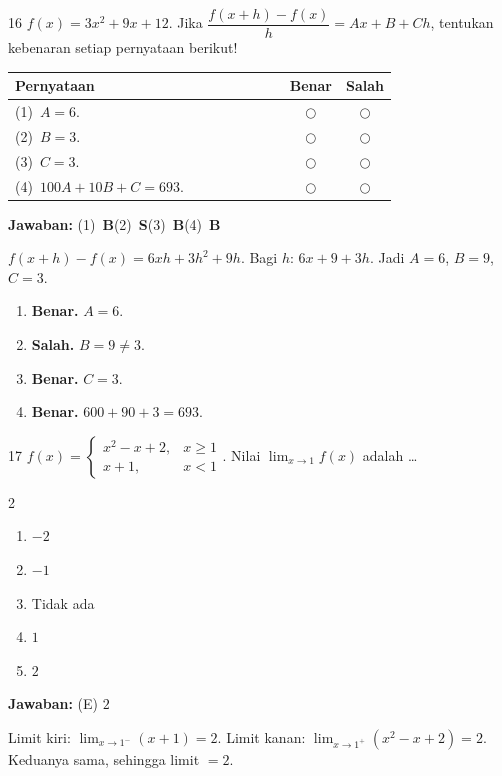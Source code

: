 \documentclass[11pt]{article}
\newcommand{\jawaban}[1]{%
  \noindent\colorbox{gold!30}{\parbox{\dimexpr\linewidth-2\fboxsep\relax}{%
    \textbf{Jawaban:} #1}}\par\smallskip}
\newenvironment{pilB}{%
  \par\smallskip\begin{multicols}{2}
  \begin{enumerate}[label=(\Alph*),leftmargin=*,itemsep=1pt,topsep=3pt]}%
  {\end{enumerate}\end{multicols}}
\begin{document}
\begin{soal}{16}
$f(x)=3x^2+9x+12$. Jika $\dfrac{f(x+h)-f(x)}{h}=Ax+B+Ch$,
tentukan kebenaran setiap pernyataan berikut!

\par\smallskip
{\renewcommand{\arraystretch}{1.4}%
\begin{tabular}{@{}p{0.76\linewidth}cc@{}}
\hline\textbf{Pernyataan}&\textbf{Benar}&\textbf{Salah}\\\hline
(1)~$A=6$.&$\bigcirc$&$\bigcirc$\\
(2)~$B=3$.&$\bigcirc$&$\bigcirc$\\
(3)~$C=3$.&$\bigcirc$&$\bigcirc$\\
(4)~$100A+10B+C=693$.&$\bigcirc$&$\bigcirc$\\\hline
\end{tabular}}
\end{soal}
\begin{pembox}
\jawaban{(1)~\textbf{B}\quad(2)~\textbf{S}\quad(3)~\textbf{B}\quad(4)~\textbf{B}}
$f(x+h)-f(x)=6xh+3h^2+9h$. Bagi $h$: $6x+9+3h$. Jadi $A=6$, $B=9$, $C=3$.
\begin{enumerate}[leftmargin=*,topsep=2pt,itemsep=2pt]
\item \textbf{Benar.} $A=6$.
\item \textbf{Salah.} $B=9\neq3$.
\item \textbf{Benar.} $C=3$.
\item \textbf{Benar.} $600+90+3=693$.
\end{enumerate}
\end{pembox}

\begin{soal}{17}
$f(x)=\begin{cases}x^2-x+2,&x\geq1\\x+1,&x<1\end{cases}$.
Nilai $\lim_{x\to1}f(x)$ adalah \ldots
\begin{pilB}\item $-2$\item $-1$\item Tidak ada\item $1$\item $2$\end{pilB}
\end{soal}
\begin{pembox}
\jawaban{(E) $2$}
Limit kiri: $\lim_{x\to1^-}(x+1)=2$.\quad
Limit kanan: $\lim_{x\to1^+}(x^2-x+2)=2$.
Keduanya sama, sehingga limit $=2$.
\end{pembox}
\end{document}

